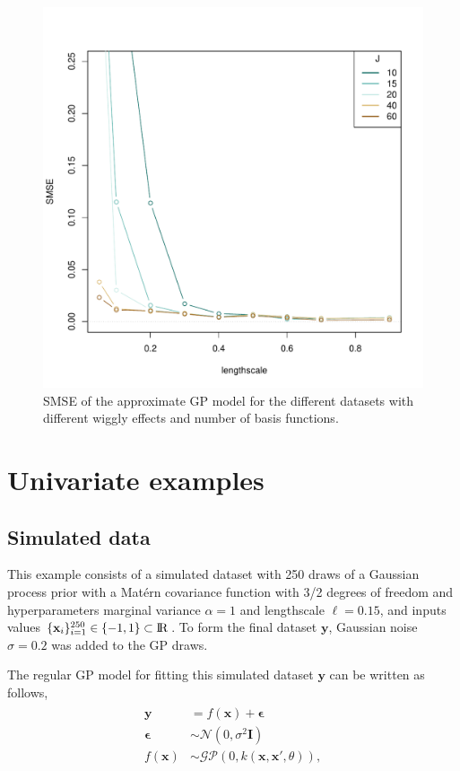 \documentclass[]{interact}
\theoremstyle{plain}%
\theoremstyle{definition}
\theoremstyle{remark}
\begin{document}
\begin{figure}[H]
\centering
\includegraphics[scale=0.45]{fig9_MSE_varing_lscale.pdf}
\caption{SMSE of the approximate GP model for the different datasets with different wiggly effects and number of basis functions.}
  \label{fig9_MSE_varing_lscale}
\end{figure}


\vspace{3mm}
\section{Univariate examples}\label{sec:gp_examples1D}


\subsection{Simulated data}

This example consists of a simulated dataset with 250 draws of a Gaussian process prior with a Mat{\'e}rn covariance function with 3/2 degrees of freedom and hyperparameters marginal variance $\alpha=1$ and lengthscale $\ell=0.15$, and inputs values $\{\mathbf{x}_i\}_{i=1}^{250} \in \{-1,1\} \subset {\rm I\!R}$. To form the final dataset $\mathbf{y}$, Gaussian noise $\sigma=0.2$ was added to the GP draws.

The regular GP model for fitting this simulated dataset $\mathbf{y}$ can be written as follows,
%
\begin{eqnarray*}\label{eq:latentgp_simudata1}
\begin{split}
\mathbf{y} &= f(\mathbf{x}) + \boldsymbol{\epsilon} \\
\boldsymbol{\epsilon} &\sim \mathcal{N}(0, \sigma^2  \mathbf{I}) \\
f(\mathbf{x}) &\sim \mathcal{GP}(0, k(\mathbf{x}, \mathbf{x}', \theta)),
\end{split}
\end{eqnarray*}
\end{document}
